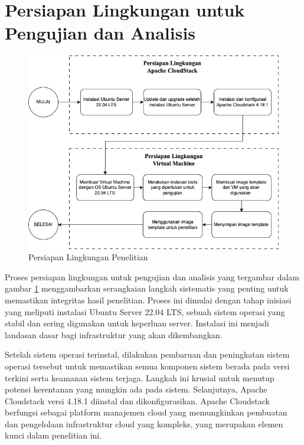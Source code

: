 \section{Persiapan Lingkungan untuk Pengujian dan Analisis}
\begin{figure}
    \centering
    \includegraphics[width=1\textwidth]
    {assets/pics/persiapan_lingkungan_penelitian.png}
    \caption{Persiapan Lingkungan Penelitian}
    \label{fig:PersiapanLingkunganPenelitian}
\end{figure}


Proses persiapan lingkungan untuk pengujian dan analisis yang tergambar dalam gambar \ref{fig:PersiapanLingkunganPenelitian} menggambarkan serangkaian langkah sistematis yang penting untuk memastikan integritas hasil penelitian. Proses ini dimulai dengan tahap inisiasi yang meliputi instalasi Ubuntu Server 22.04 LTS, sebuah sistem operasi yang stabil dan sering digunakan untuk keperluan server. Instalasi ini menjadi landasan dasar bagi infrastruktur yang akan dikembangkan.

Setelah sistem operasi terinstal, dilakukan pembaruan dan peningkatan sistem operasi tersebut untuk memastikan semua komponen sistem berada pada versi terkini serta keamanan sistem terjaga. Langkah ini krusial untuk menutup potensi kerentanan yang mungkin ada pada sistem. Selanjutnya, Apache Cloudstack versi 4.18.1 diinstal dan dikonfigurasikan. Apache Cloudstack berfungsi sebagai platform manajemen cloud yang memungkinkan pembuatan dan pengelolaan infrastruktur cloud yang kompleks, yang merupakan elemen kunci dalam penelitian ini.

